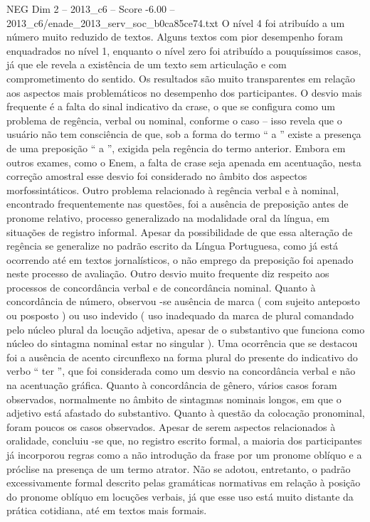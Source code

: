 \begin{textsample}{NEG Dim 2 – 2013\_c6 – Score -6.00 – 2013\_c6/enade\_2013\_serv\_soc\_b0ca85ce74.txt}
O nível 4 foi atribuído a um número muito reduzido de textos.
Alguns textos com pior desempenho foram enquadrados no nível 1, enquanto o nível zero foi atribuído a pouquíssimos casos, já que ele revela a existência de um texto sem articulação e com comprometimento do sentido.
Os resultados são muito transparentes em relação aos aspectos mais problemáticos no desempenho dos participantes.
O desvio mais frequente é a falta do sinal indicativo da crase, o que se configura como um problema de regência, verbal ou nominal, conforme o caso – isso revela que o usuário não tem consciência de que, sob a forma do termo “ a ” existe a presença de uma preposição “ a ”, exigida pela regência do termo anterior.
Embora em outros exames, como o Enem, a falta de crase seja apenada em acentuação, nesta correção amostral esse desvio foi considerado no âmbito dos aspectos morfossintáticos.
Outro problema relacionado à regência verbal e à nominal, encontrado frequentemente nas questões, foi a ausência de preposição antes de pronome relativo, processo generalizado na modalidade oral da língua, em situações de registro informal.
Apesar da possibilidade de que essa alteração de regência se generalize no padrão escrito da Língua Portuguesa, como já está ocorrendo até em textos jornalísticos, o não emprego da preposição foi apenado neste processo de avaliação.
Outro desvio muito frequente diz respeito aos processos de concordância verbal e de concordância nominal.
Quanto à concordância de número, observou -se ausência de marca ( com sujeito anteposto ou posposto ) ou uso indevido ( uso inadequado da marca de plural comandado pelo núcleo plural da locução adjetiva, apesar de o substantivo que funciona como núcleo do sintagma nominal estar no singular ).
Uma ocorrência que se destacou foi a ausência de acento circunflexo na forma plural do presente do indicativo do verbo “ ter ”, que foi considerada como um desvio na concordância verbal e não na acentuação gráfica.
Quanto à concordância de gênero, vários casos foram observados, normalmente no âmbito de sintagmas nominais longos, em que o adjetivo está afastado do substantivo.
Quanto à questão da colocação pronominal, foram poucos os casos observados.
Apesar de serem aspectos relacionados à oralidade, concluiu -se que, no registro escrito formal, a maioria dos participantes já incorporou regras como a não introdução da frase por um pronome oblíquo e a próclise na presença de um termo atrator.
Não se adotou, entretanto, o padrão excessivamente formal descrito pelas gramáticas normativas em relação à posição do pronome oblíquo em locuções verbais, já que esse uso está muito distante da prática cotidiana, até em textos mais formais.

\end{textsample}
